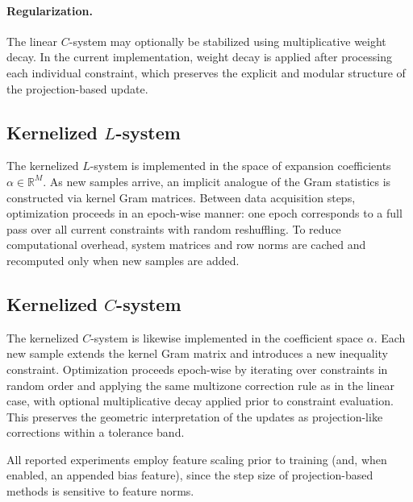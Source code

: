 \documentclass[a4paper,fleqn]{cas-sc}
\begin{document}
\paragraph{Regularization.}
The linear $C$-system may optionally be stabilized using multiplicative weight decay.
In the current implementation, weight decay is applied after processing each individual constraint,
which preserves the explicit and modular structure of the projection-based update.


\subsection{Kernelized $L$-system}
\label{subsec:impl_kernel_L}

The kernelized $L$-system is implemented in the space of expansion coefficients
$\alpha\in\mathbb{R}^M$.
As new samples arrive, an implicit analogue of the Gram statistics
is constructed via kernel Gram matrices.
Between data acquisition steps, optimization proceeds in an epoch-wise manner:
one epoch corresponds to a full pass over all current constraints
with random reshuffling.
To reduce computational overhead, system matrices and row norms are cached
and recomputed only when new samples are added.


\subsection{Kernelized $C$-system}
\label{subsec:impl_kernel_C}

The kernelized $C$-system is likewise implemented in the coefficient space $\alpha$.
Each new sample extends the kernel Gram matrix and introduces a new inequality constraint.
Optimization proceeds epoch-wise by iterating over constraints in random order
and applying the same multizone correction rule as in the linear case,
with optional multiplicative decay applied prior to constraint evaluation.
This preserves the geometric interpretation of the updates
as projection-like corrections within a tolerance band.

\begin{rmk}
    All reported experiments employ feature scaling prior to training (and, when enabled, an appended bias feature), since the step size of projection-based methods is sensitive to feature norms. 
\end{rmk}



% 





\end{document}
